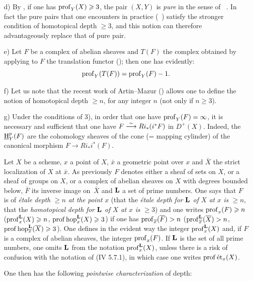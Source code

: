 \begin{remarks}
d) By , if one has $\operatorname{prof}_Y(X)\geqslant 3$, the pair $(X, Y)$ is \textit{pure} in the sense of ~. In fact the pure pairs that one encounters in practice (\cf {}~) satisfy the stronger condition of homotopical depth $\geq 3$, and this notion can therefore advantageously replace that of pure pair.

e) Let $F$ be a complex of abelian sheaves and $T(F)$ the complex obtained by applying to $F$ the translation functor (\cite{XIV.3}); then one has evidently:
$$
\operatorname{prof}_Y(T(F))=\operatorname{prof}_Y(F)-1.
$$

f) Let us note that the recent work of Artin--Mazur (\cite{XIV.1}) allows one to define the notion of homotopical depth $\geq n$, for any integer $n$ (not only if $n\geq 3$).

g) Under the conditions of  3), in order that one have $\operatorname{prof}_Y(F)=\infty$, it is necessary and sufficient that one have $F\overset{\sim}{\longrightarrow} Ri_*(i^*F)$ in $D^+(X)$. Indeed, the ${\operatorname{\underline{H}}}_Y^p(F)$ are the cohomology sheaves of the cone (= mapping cylinder) of the canonical morphism $F\to Ri_*i^*(F)$.
\end{remarks}

\begin{definition} \label{XIV.1.7}
Let $X$ be a scheme, $x$ a point of $X$, $\bar x$ a geometric point over $x$ and $\bar X$ the strict localization of $X$ at $\bar x$. As previously $F$ denotes either a sheaf of sets on $X$, or a sheaf of groups on $X$, or a complex of abelian sheaves on $X$ with degrees bounded below, $\bar F$ its inverse image on~$\bar X$ and $\mathbf{L}$ a set of prime numbers. One says that $F$ is of \emph{\'etale depth $\geq n$ at the point $x$} (\resp that the \emph{\'etale depth for $\mathbf{L}$ of $X$ at $x$ is $\geq n$}, \resp that the \emph{homotopical depth for $\mathbf{L}$ of $X$ at $x$ is $\geq 3$}) and one writes $\operatorname{prof}_x(F)\geqslant n$ (\resp $\operatorname{prof}_x^{\mathbf{L}}(X)\geqslant n$, \resp $\operatorname{prof} \operatorname{hop}_x^{\mathbf{L}}(X)\geqslant 3$) if one has $\operatorname{prof}_{\overline x}(\overline F)>n$ (\resp $\operatorname{prof}_{\overline x}^{\mathbf{L}}(\overline X)>\nobreak n$, \resp $\operatorname{prof} \operatorname{hop}_{\overline x}^{\mathbf{L}}(\overline X)\geqslant 3$). One defines in the evident way the integer $\operatorname{prof}_x^{\mathbf{L}}(X)$ and, if $F$ is a complex of abelian sheaves, the integer $\operatorname{prof}_x(F)$. If $\mathbf{L}$ is the set of all prime numbers, one omits $\mathbf{L}$ from the notation $\operatorname{prof}_x^{\mathbf{L}}(X)$, unless there is a risk of confusion with the notation of \textup{(\EGA IV 5.7.1)}, in which case one writes $\operatorname{prof} {\textup{\'et}}_x(X)$.
\end{definition}

One then has the following \textit{pointwise characterization} of depth:

